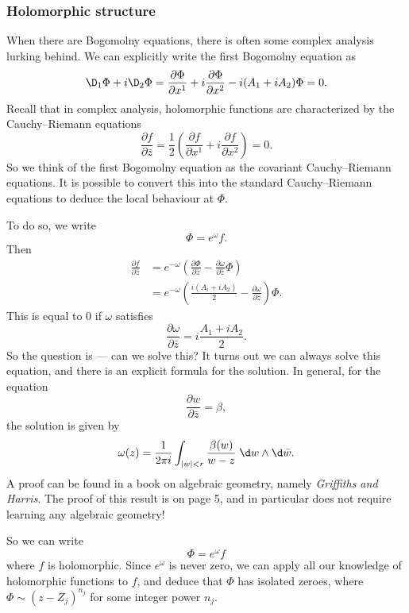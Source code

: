 \documentclass[a4paper]{article}
\begin{document}
\subsubsection*{Holomorphic structure}
When there are Bogomolny equations, there is often some complex analysis lurking behind. We can explicitly write the first Bogomolny equation as
\[
  \D_1 \Phi + i \D_2 \Phi = \frac{\partial \Phi}{\partial x^1} + i\frac{\partial \Phi}{\partial x^2} - i(A_1 + i A_2) \Phi = 0.
\]
Recall that in complex analysis, holomorphic functions are characterized by the Cauchy--Riemann equations
\[
  \frac{\partial f}{\partial \bar{z}} = \frac{1}{2} \left(\frac{\partial f}{\partial x^1} + i \frac{\partial f}{\partial x^2}\right) = 0.
\]
So we think of the first Bogomolny equation as the covariant Cauchy--Riemann equations. It is possible to convert this into the standard Cauchy--Riemann equations to deduce the local behaviour at $\Phi$.

To do so, we write
\[
  \Phi = e^{\omega} f.
\]
Then
\begin{align*}
  \frac{\partial f}{\partial \bar{z}} &= e^{-\omega} \left(\frac{\partial \Phi}{\partial \bar{z}} - \frac{\partial \omega}{\partial \bar{z}} \Phi\right)\\
  &= e^{-\omega} \left(\frac{i(A_i + i A_2)}{2} - \frac{\partial \omega}{\partial \bar{z}}\right)\Phi.
\end{align*}
This is equal to $0$ if $\omega$ satisfies
\[
  \frac{\partial \omega}{\partial \bar{z}} = i \frac{A_1 + iA_2}{2}.
\]
So the question is --- can we solve this? It turns out we can always solve this equation, and there is an explicit formula for the solution. In general, for the equation
\[
  \frac{\partial w}{\partial \bar{z}} = \beta,
\]
the solution is given by
\[
  \omega(z) = \frac{1}{2\pi i} \int_{|w| < r} \frac{\beta(w)}{w - z}\;\d w \wedge \d \bar{w}.
\]
A proof can be found in a book on algebraic geometry, namely \emph{Griffiths and Harris}. The proof of this result is on page 5, and in particular does not require learning any algebraic geometry!

So we can write
\[
  \Phi = e^{\omega} f
\]
where $f$ is holomorphic. Since $e^{\omega}$ is never zero, we can apply all our knowledge of holomorphic functions to $f$, and deduce that $\Phi$ has isolated zeroes, where $\Phi \sim (z - Z_j)^{n_j}$ for some integer power $n_j$.
\end{document}
